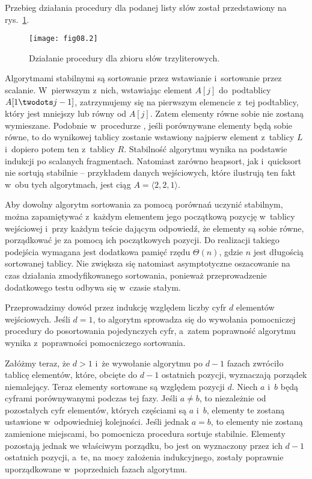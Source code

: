 
\exercise %
Przebieg działania procedury  dla podanej listy słów został przedstawiony na rys.~\ref{fig:8.3-1}.
\begin{figure}[ht]
	\begin{center}
		\texttt{[image: fig08.2]}
	\end{center}
	\caption{Działanie procedury  dla zbioru słów trzyliterowych.} \label{fig:8.3-1}
\end{figure}

\exercise %
Algorytmami stabilnymi są sortowanie przez wstawianie i~sortowanie przez scalanie. W~pierwszym z~nich, wstawiając element $A[j]$ do~podtablicy $A[1\twodots j-1]$, zatrzymujemy się na pierwszym elemencie z~tej podtablicy, który jest mniejszy lub równy od $A[j]$. Zatem elementy równe sobie nie zostaną wymieszane. Podobnie w~procedurze , jeśli porównywane elementy będą sobie równe, to do wynikowej tablicy zostanie wstawiony najpierw element z~tablicy $L$ i~dopiero potem ten z~tablicy $R$. Stabilność algorytmu wynika na podstawie indukcji po scalanych fragmentach. Natomiast zarówno heapsort, jak i~quicksort nie sortują stabilnie -- przykładem danych wejściowych, które ilustrują ten fakt w~obu tych algorytmach, jest ciąg $A=\langle2,2,1\rangle$.

Aby dowolny algorytm sortowania za pomocą porównań uczynić stabilnym, można zapamiętywać z~każdym elementem jego początkową pozycję w~tablicy wejściowej i~przy każdym teście dającym odpowiedź, że elementy są sobie równe, porządkować je za pomocą ich początkowych pozycji. Do realizacji takiego podejścia wymagana jest dodatkowa pamięć rzędu $\Theta(n)$, gdzie $n$ jest długością sortowanej tablicy. Nie zwiększa się natomiast asymptotyczne oszacowanie na czas działania zmodyfikowanego sortowania, ponieważ przeprowadzenie dodatkowego testu odbywa się w~czasie stałym.

\exercise %
Przeprowadzimy dowód przez indukcję względem liczby cyfr $d$ elementów wejściowych. Jeśli $d=1$, to algorytm  sprowadza się do wywołania pomocniczej procedury do posortowania pojedynczych cyfr, a~zatem poprawność algorytmu wynika z~poprawności pomocniczego sortowania.

Załóżmy teraz, że $d>1$ i~że wywołanie algorytmu  po $d-1$ fazach zwróciło tablicę elementów, które, obcięte do $d-1$ ostatnich pozycji, wyznaczają porządek niemalejący. Teraz elementy sortowane są względem pozycji $d$. Niech $a$ i~$b$ będą cyframi porównywanymi podczas tej fazy. Jeśli $a\ne b$, to niezależnie od pozostałych cyfr elementów, których częściami są $a$ i~$b$, elementy te zostaną ustawione w~odpowiedniej kolejności. Jeśli jednak $a=b$, to elementy nie zostaną zamienione miejscami, bo pomocnicza procedura sortuje stabilnie. Elementy pozostają jednak we właściwym porządku, bo jest on wyznaczony przez ich $d-1$ ostatnich pozycji, a~te, na mocy założenia indukcyjnego, zostały poprawnie uporządkowane w~poprzednich fazach algorytmu.

